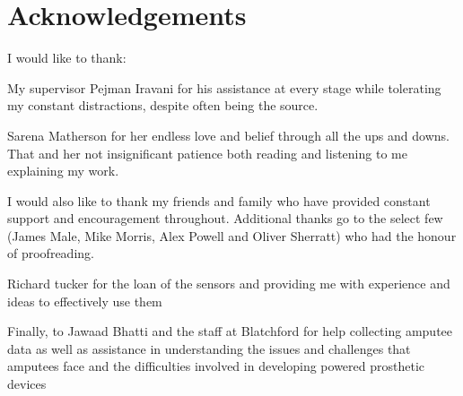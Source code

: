 \chapter*{Acknowledgements}

I would like to thank:

My supervisor Pejman Iravani for his assistance at every stage while tolerating my constant distractions, despite often being the source.

Sarena Matherson for her endless love and belief through all the ups and downs. That and her not insignificant patience both reading and listening to me explaining my work.

I would also like to thank my friends and family who have provided constant support and encouragement throughout. Additional thanks go to the select few (James Male, Mike Morris, Alex Powell and Oliver Sherratt) who had the honour of proofreading.

Richard tucker for the loan of the sensors and providing me with experience and ideas to effectively use them 

Finally, to Jawaad Bhatti and the staff at Blatchford for help collecting amputee data as well as assistance in understanding the issues and challenges that amputees face and the difficulties involved in developing powered prosthetic devices